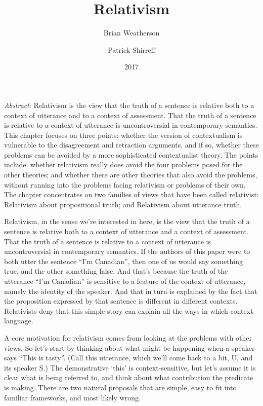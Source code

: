 \documentclass[
  11pt,
  letterpaper,
  DIV=11,
  numbers=noendperiod,
  twoside]{scrartcl}
\title{Relativism}
\author{Brian Weatherson \and Patrick Shirreff}
\date{2017}
\renewenvironment{abstract}
 {\vspace{-1.25cm}
 \quotation\small\noindent\emph{Abstract}:}
 {\endquotation}
\begin{document}
\maketitle
\begin{abstract}
Relativism is the view that the truth of a sentence is relative both to
a context of utterance and to a context of assessment. That the truth of
a sentence is relative to a context of utterance is uncontroversial in
contemporary semantics. This chapter focuses on three points: whether
the version of contextualism is vulnerable to the disagreement and
retraction arguments, and if so, whether these problems can be avoided
by a more sophisticated contextualist theory. The points include:
whether relativism really does avoid the four problems posed for the
other theories; and whether there are other theories that also avoid the
problems, without running into the problems facing relativism or
problems of their own. The chapter concentrates on two families of views
that have been called relativist: Relativism about propositional truth;
and Relativism about utterance truth.
\end{abstract}


Relativism, in the sense we're interested in here, is the view that the
truth of a sentence is relative both to a context of utterance and a
context of assessment. That the truth of a sentence is relative to a
context of utterance is uncontroversial in contemporary semantics. If
the authors of this paper were to both utter the sentence ``I'm
Canadian'', then one of us would say something true, and the other
something false. And that's because the truth of the utterance ``I'm
Canadian'' is sensitive to a feature of the context of utterance, namely
the identity of the speaker. And that in turn is explained by the fact
that the proposition expressed by that sentence is different in
different contexts. Relativists deny that this simple story can explain
all the ways in which context language.

A core motivation for relativism comes from looking at the problems with
other views. So let's start by thinking about what might be happening
when a speaker says ``This is tasty''. (Call this utterance, which we'll
come back to a bit, U, and its speaker S.) The demonstrative `this' is
context-sensitive, but let's assume it is clear what is being referred
to, and think about what contribution the predicate is making. There are
two natural proposals that are simple, easy to fit into familiar
frameworks, and most likely wrong.
\end{document}
